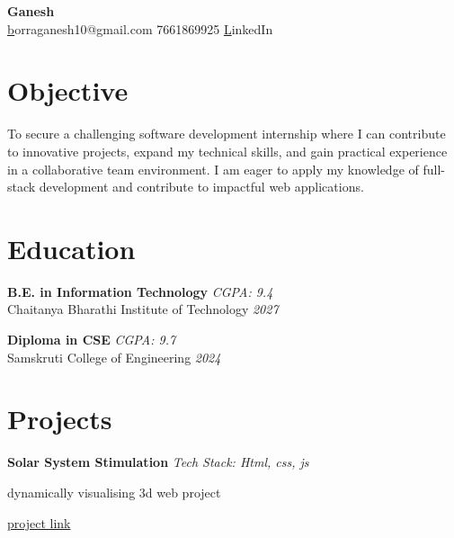 \documentclass[a4paper,10pt]{article}
\begin{document}
\begin{center}
    {\huge \textbf{ Ganesh }} \\
    \vspace{5pt}
    \small \href{mailto:borraganesh10@gmail.com } borraganesh10@gmail.com \quad \textbullet{} 7661869925     
    \quad \textbullet{} \href{ https://www.linkedin.com/in/ganesh10-/ }LinkedIn 
  
\end{center}

    
\section*{Objective}
\noindent
To secure a challenging software development internship where I can contribute to innovative projects, expand my technical skills, and gain practical experience in a collaborative team environment.  I am eager to apply my knowledge of full-stack development and contribute to impactful web applications.
\vspace{0.3cm}


\section*{Education}

\noindent
\textbf{ B.E. in Information Technology } \hfill  \textit{ CGPA: 9.4 } \\
Chaitanya Bharathi Institute of Technology  \hfill  \textit{ 2027 } 
\vspace{0.3cm}

\noindent
\textbf{ Diploma in CSE } \hfill  \textit{ CGPA: 9.7 } \\
Samskruti College of Engineering  \hfill  \textit{ 2024 } 
\vspace{0.3cm}



\section*{Projects}
\noindent
\begin{compactitem}
    
        \item\textbf{ Solar System Stimulation } \hfill \textit{ Tech Stack: Html, css, js } 
        \begin{compactitem}
            
            \item dynamically visualising 3d web project
            
        \end{compactitem}
        \href{ www.google.com }{project link}
    
\end{compactitem}
\end{document}
